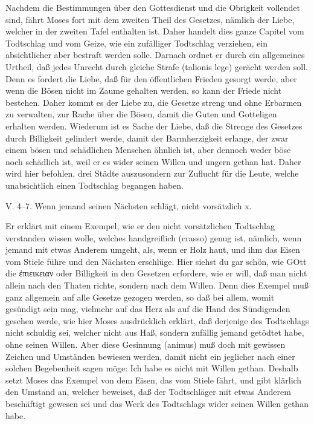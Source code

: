 Nachdem die Bestimmungen über den Gottesdienst und die Obrigkeit vollendet sind, fährt Moses fort mit dem zweiten Theil des Gesetzes, nämlich der Liebe, welcher in der zweiten Tafel enthalten ist. Daher handelt dies ganze Capitel vom Todtschlag und vom Geize, wie ein zufälliger Todtschlag verziehen, ein absichtlicher aber bestraft werden solle. Darnach ordnet er durch ein allgemeines Urtheil, daß jedes Unrecht durch gleiche Strafe (talionis lege) gerächt werden soll. Denn es fordert die Liebe, daß für den öffentlichen Frieden gesorgt werde, aber wenn die
Bösen nicht im Zaume gehalten werden, so kann der Friede nicht bestehen. Daher kommt es der Liebe zu, die Gesetze streng und ohne Erbarmen zu verwalten, zur Rache über die Bösen, damit die Guten und Gotteligen erhalten werden. Wiederum ist es Sache der Liebe, daß die Strenge des Gesetzes durch Billigkeit gelindert werde, damit der Barmherzigkeit erlange, der zwar einem bösen und schädlichen Menschen ähnlich ist, aber dennoch weder böse noch schädlich ist, weil er es wider seinen Willen und ungern gethan hat. Daher wird hier befohlen, drei Städte auszusondern zur Zuflucht für die Leute, welche unabsichtlich einen Todtschlag begangen haben.

\begin{schriftzitat}
V. 4–7. Wenn jemand seinen Nächsten schlägt, nicht vorsätzlich x.
\end{schriftzitat}

Er erklärt mit einem Exempel, wie er den nicht vorsätzlichen Todtschlag verstanden wissen wolle, welches handgreiflich (crasso) genug ist, nämlich, wenn jemand mit etwas Anderem umgeht, als, wenn er Holz haut, und ihm das Eisen vom Stiele führe und den Nächsten erschlüge. Hier siehst du gar schön, wie GOtt die ἐπιεικειαν oder Billigkeit in den Gesetzen erfordere, wie er will, daß man nicht allein nach den Thaten richte, sondern nach dem Willen. Denn dies Exempel muß ganz allgemein auf alle Gesetze gezogen werden, so daß bei allem, womit gesündigt sein mag, vielmehr auf das Herz als auf die Hand des Sündigenden gesehen werde, wie hier Moses ausdrücklich erklärt, daß derjenige des Todtschlags nicht schuldig sei, welcher nicht aus Haß, sondern zufällig jemand getödtet habe, ohne seinen Willen. Aber diese Gesinnung (animus) muß doch mit gewissen Zeichen und Umständen bewiesen werden, damit nicht ein jeglicher nach einer solchen Begebenheit sagen möge: Ich habe es nicht mit Willen gethan. Deshalb setzt Moses das Exempel von dem Eisen, das vom Stiele fährt, und gibt klärlich den Umstand an, welcher beweiset, daß der Todtschläger mit etwas Anderem beschäftigt gewesen sei und das Werk des Todtschlags wider seinen Willen gethan habe.

